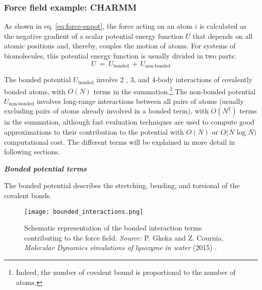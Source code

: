 \subsubsection{Force field example: CHARMM}

As shown in eq. \eqref{eq:force-enpot}, the force acting on an atom $i$ is calculated as the negative gradient of a scalar potential energy function $U$ that depends on all atomic positions and, thereby, couples the motion of atoms. For systems of biomolecules, this potential energy function is usually divided in two parts:
\begin{equation}\label{eq:forcefield-PotEnergy}
U \: = \: U_{\text{bonded}} \, + \, U_{\text{non-bonded}} 
\end{equation}

The bonded potential $U_{\text{bonded}}$ involve 2 , 3, and 4-body interactions of covalently bonded atoms, with $O(N)$ terms in the summation.\footnote{Indeed, the number of covalent bound is proportional to the number of atoms.}
The non-bonded potential $U_{\text{non-bonded}}$ involves long-range interactions between all pairs of atoms (usually excluding pairs of atoms already involved in a bonded term), with $O(N^2)$ terms in the summation, although fast evaluation techniques are used to compute good approximations to their contribution to the potential with $O(N)$ or $O(N$ log $N )$ computational cost. The different terms will be explained in more detail in following sections.

\vspace{0.25cm}

\begin{center}
{\textbf{\textit{Bonded potential terms}}}
\end{center}
The bonded potential describes the stretching, bending, and torsional of the covalent bonds. 

\begin{figure}[H]
\centering
\begin{minipage}[t]{0.725\textwidth}
	\centering
    \texttt{[image: bounded\_interactions.png]}
    
    \footnotesize{\caption{Schematic representation of the bonded interaction terms contributing to the force field.
    \textit{Source:} P. Gkeka and Z. Cournia, \textit{Molecular Dynamics simulations of lysozyme in water} (2015) 
    \cite{ref:MDsim_Gkeka}.}
    \label{fig:bounded_int}
    }
\end{minipage} 
\end{figure}

